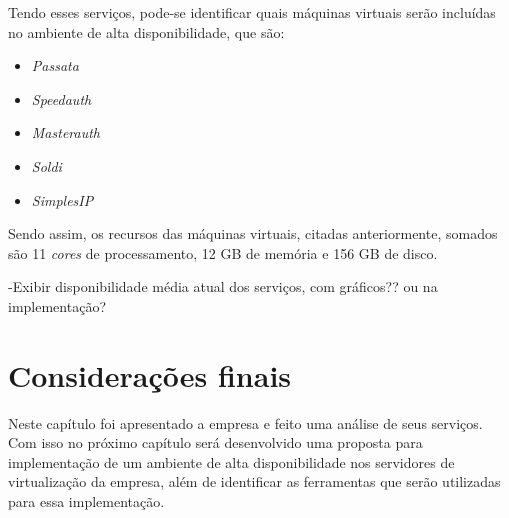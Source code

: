 Tendo esses serviços, pode-se identificar quais máquinas virtuais serão incluídas no ambiente de alta disponibilidade, que são:
\begin{itemize}
 \item \textit{Passata}
 \item \textit{Speedauth}
 \item \textit{Masterauth}
 \item \textit{Soldi}
 \item \textit{SimplesIP}
\end{itemize}

Sendo assim, os recursos das máquinas virtuais, citadas anteriormente, somados são 11 \textit{cores} de processamento, 12 GB de memória e 
156 GB de disco.

-Exibir disponibilidade média atual dos serviços, com gráficos?? ou na implementação?

\section{Considerações finais}

Neste capítulo foi apresentado a empresa e feito uma análise de seus serviços. Com isso no próximo capítulo será desenvolvido uma proposta 
para implementação de um ambiente de alta disponibilidade nos servidores de virtualização da empresa, além de identificar as ferramentas
que serão utilizadas para essa implementação.



